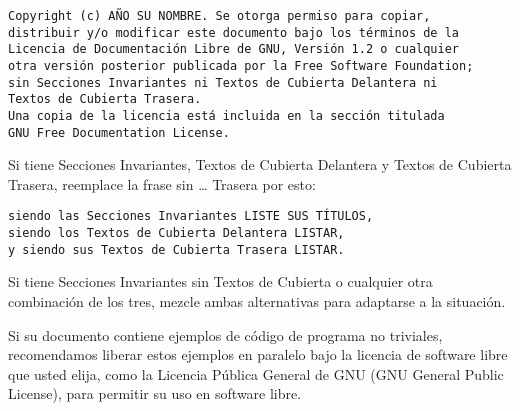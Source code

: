 \documentclass[letterpaper,12pt,titlepage]{article}
\begin{document}
\begin{verbatim}
Copyright (c) AÑO SU NOMBRE. Se otorga permiso para copiar, 
distribuir y/o modificar este documento bajo los términos de la
Licencia de Documentación Libre de GNU, Versión 1.2 o cualquier
otra versión posterior publicada por la Free Software Foundation; 
sin Secciones Invariantes ni Textos de Cubierta Delantera ni 
Textos de Cubierta Trasera.
Una copia de la licencia está incluida en la sección titulada
GNU Free Documentation License.
\end{verbatim} 

Si tiene Secciones Invariantes, Textos de Cubierta Delantera y Textos de Cubierta Trasera, reemplace la frase sin … Trasera por esto:\par

\begin{verbatim}
siendo las Secciones Invariantes LISTE SUS TÍTULOS, 
siendo los Textos de Cubierta Delantera LISTAR, 
y siendo sus Textos de Cubierta Trasera LISTAR.
\end{verbatim}

Si tiene Secciones Invariantes sin Textos de Cubierta o cualquier otra combinación de los tres, mezcle ambas alternativas para adaptarse a la situación.\par

Si su documento contiene ejemplos de código de programa no triviales, recomendamos liberar estos ejemplos en paralelo bajo la licencia de software libre que usted elija, como la Licencia Pública General de GNU (GNU General Public License), para permitir su uso en software libre.\par
\end{document}
